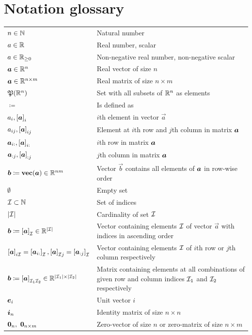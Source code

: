 \chapter*{Notation glossary}

{\renewcommand{\arraystretch}{1.5}
	\begin{longtable}{p{5cm} p{10cm}}
$n \in \mathbb{N}$ & Natural number \\ 
$a \in \mathbb{R}$ & Real number, scalar \\ 
$a \in \mathbb{R}_{\geq 0}$ & Non-negative real number, non-negative scalar \\
$\bm{a}\in \mathbb{R}^{n}$ &  Real vector of size $n$ \\
$\bm{a}\in \mathbb{R}^{n\times m}$ &  Real matrix of size $n\times m$ \\
$\mathfrak{P}(\mathbb{R}^{n})$ & Set with all subsets of $\mathbb{R}^{n}$ as elements \\
$\coloneqq$ & Is defined as \\
$a_{i}, \left[\bm{a}\right]_{i}$ & $i$th element in vector $\vec{a}$ \\
${a}_{i j}, \left[\bm{a}\right]_{i j}$ & Element at $i$th row and $j$th column in matrix $\bm{a}$ \\
${\bm{a}}_{i :}, \left[\bm{a}\right]_{i :}$ & $i$th row in matrix $\bm{a}$ \\
${\bm{a}}_{: j}, \left[\bm{a}\right]_{: j}$ & $j$th column in matrix $\bm{a}$ \\
$\bm{b} \coloneqq \operatorname{\mathbf{vec}} (\bm{a}) \in \mathbb{R}^{nm}$ & Vector $\vec{b}$ contains all elements of $\bm{a}$ in row-wise order \\
$\emptyset$ & Empty set \\
$\mathcal{I}\subset\mathbb{N}$ & Set of indices \\
$\left\vert \mathcal{I} \right\vert$ & Cardinality of set $\mathcal{I}$ \\
$\bm{b}\coloneqq\left[\bm{a}\right]_{\mathcal{I}}\in \mathbb{R}^{\left\vert \mathcal{I} \right\vert}$ & Vector containing elements $\mathcal{I}$ of vector $\vec{a}$ with indices in ascending order\\
$\left[\bm{a}\right]_{i \mathcal{I}} = \left[{\bm{a}}_{i :}\right]_{\mathcal{I}}, 
 \left[\bm{a}\right]_{\mathcal{I} j} = \left[{\bm{a}}_{: j}\right]_{\mathcal{I}} $ & Vector containing elements $\mathcal{I}$ of $i$th row or $j$th column respectively \\
$\bm{b} \coloneqq \left[\bm{a}\right]_{\mathcal{I}_1 \mathcal{I}_2} \in \mathbb{R}^{\left\vert \mathcal{I}_1 \right\vert \times \left\vert \mathcal{I}_2 \right\vert}$ & Matrix containing elements at all combinations of given row and column indices $\mathcal{I}_1$ and $\mathcal{I}_2$ respectively\\
$\bm{e}_{i}$ & Unit vector $i$ \\
$\bm{i}_{n}$ & Identity matrix of size $n\times n$ \\
$\zerovec{n},\ \zeromat{n}{m}$ & Zero-vector of size $n$ or zero-matrix of size $n\times m$ \\


\end{longtable}}
